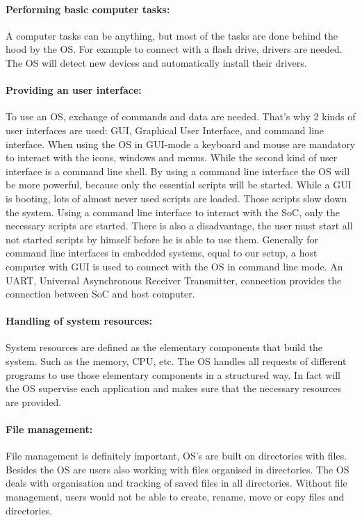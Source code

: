 \documentclass[12pt,a4paper,english,twoside,openright]{tutthesis}
\begin{document}
				\paragraph{Performing basic computer tasks:}
A computer tasks can be anything, but most of the tasks are done behind the hood by the OS. For example to connect with a flash drive, drivers are needed. The OS will detect new devices and automatically install their drivers.
				\paragraph{Providing an user interface: }
To use an OS, exchange of commands and data are needed. That's why 2 kinds of user interfaces are used: GUI, Graphical User Interface, and command line interface. When using the OS in GUI-mode a keyboard and mouse are mandatory to interact with the icons, windows and menus. While the second kind of user interface is a command line shell. By using a command line interface the OS will be more powerful, because only the essential scripts will be started. While a GUI is booting, lots of almost never used scripts are loaded. Those scripts slow down the system. Using a command line interface to interact with the SoC, only the necessary scripts are started. There is also a disadvantage, the user must start all not started scripts by himself before he is able to use them. Generally for command line interfaces in embedded systems, equal to our setup, a host computer with GUI is used to connect with the OS in command line mode. An UART, Universal Asynchronous Receiver Transmitter, connection provides the connection between SoC and host computer.
				\paragraph{Handling of system resources:}
System resources are defined as the elementary components that build the system. Such as the memory,  CPU, etc. The OS handles all requests of different programs to use those elementary components in a structured way. In fact will the OS supervise each application and makes sure that the necessary resources are provided.
				\paragraph{File management:}
File management is definitely important, OS's are built on directories with files. Besides the OS are users also working with files organised in directories. The OS deals with organisation and tracking of saved files in all directories. Without file management, users would not be able to create, rename, move or copy files and directories.
\end{document}

